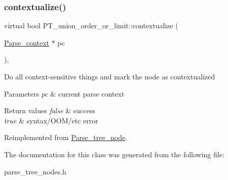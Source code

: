 \subsubsection{\texorpdfstring{contextualize()}{contextualize()}}
{\footnotesize\ttfamily virtual bool P\+T\+\_\+union\+\_\+order\+\_\+or\+\_\+limit\+::contextualize (\begin{DoxyParamCaption}\item[{\mbox{\hyperlink{structParse__context}{Parse\+\_\+context}} $\ast$}]{pc }\end{DoxyParamCaption})\hspace{0.3cm}{\ttfamily [inline]}, {\ttfamily [virtual]}}

Do all context-\/sensitive things and mark the node as contextualized


\begin{DoxyParams}{Parameters}
{\em pc} & current parse context\\
\hline
\end{DoxyParams}

\begin{DoxyRetVals}{Return values}
{\em false} & success \\
\hline
{\em true} & syntax/\+O\+O\+M/etc error \\
\hline
\end{DoxyRetVals}


Reimplemented from \mbox{\hyperlink{classParse__tree__node_a22d93524a537d0df652d7efa144f23da}{Parse\+\_\+tree\+\_\+node}}.



The documentation for this class was generated from the following file\+:\begin{DoxyCompactItemize}
\item 
parse\+\_\+tree\+\_\+nodes.\+h\end{DoxyCompactItemize}
